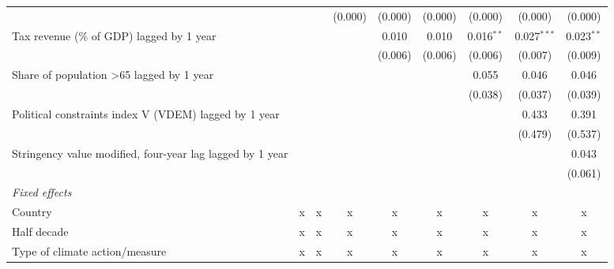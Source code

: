 \begin{tabular}{lcccccccc}
                                                                      &         &         & (0.000) & (0.000)     & (0.000)     & (0.000)        & (0.000)        & (0.000)\\   
   Tax revenue (\% of GDP) lagged by 1 year                           &         &         &         & 0.010       & 0.010       & 0.016$^{**}$   & 0.027$^{***}$  & 0.023$^{**}$\\   
                                                                      &         &         &         & (0.006)     & (0.006)     & (0.006)        & (0.007)        & (0.009)\\   
   Share of population >65 lagged by 1 year                           &         &         &         &             &             & 0.055          & 0.046          & 0.046\\   
                                                                      &         &         &         &             &             & (0.038)        & (0.037)        & (0.039)\\   
   Political constraints index V (VDEM) lagged by 1 year              &         &         &         &             &             &                & 0.433          & 0.391\\   
                                                                      &         &         &         &             &             &                & (0.479)        & (0.537)\\   
   Stringency value modified, four-year lag lagged by 1 year          &         &         &         &             &             &                &                & 0.043\\   
                                                                      &         &         &         &             &             &                &                & (0.061)\\   
   \emph{Fixed effects}\\
   Country                                                            & x       & x       & x       & x           & x           & x              & x              & x\\  
   Half decade                                                        & x       & x       & x       & x           & x           & x              & x              & x\\  
   Type of climate action/measure                                     & x       & x       & x       & x           & x           & x              & x              & x\\  

\end{tabular}
